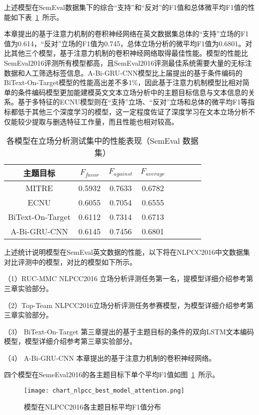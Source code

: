 上述模型在SemEval数据集下的综合“支持”和“反对”的F1值和总体微平均F1值的性能如下表~\ref{semeval_attention_res}~所示。


本章提出的基于注意力机制的卷积神经网络在英文数据集总体的“支持”立场的F1值为0.614，“反对”立场的F1值为0.745，总体立场分析的微平均F1值为0.6801。对比其他三个模型，基于注意力机制的卷积神经网络取得最佳性能。模型的性能比SemEval2016评测所有模型都高，且SemEval2016评测最佳系统需要大量的无标注数据和人工筛选标签信息。A-Bi-GRU-CNN模型比上届提出的基于条件编码的BiText-On-Target模型的性能高出差不多1\%，因此基于注意力机制模型比相对简单的条件编码模型更加能建模英文文本立场分析中的主题目标信息与文本信息的关系。基于多特征的ECNU模型则在“支持”立场、“反对”立场和总体的微平均F1等指标都低于其他三个深度学习的模型，这一定程度佐证了深度学习在文本立场分析不仅能较少提取与删选特征工作量，而且性能也相对较高。

\begin{table}[htbp]
	\caption[table123]{各模型在立场分析测试集中的性能表现（SemEval 数据集）}
	\vspace{0.5em}\centering\wuhao
	\label{semeval_attention_res}
	\begin{tabular}{cccccccc}
		\toprule[1.5pt]
		主题目标& $F_{favor}$&$F_{against}$&$F_{average}$ \\
		\midrule[1pt]
		MITRE&0.5932&0.7633&0.6782\\
		ECNU&0.6055&0.7054&0.6555\\
		BiText-On-Target&0.6112&0.7314&0.6713\\
			A-Bi-GRU-CNN&0.6145&0.7456&0.6801\\
		\bottomrule[1.5pt]
	\end{tabular}
\end{table}

上述统计说明模型在SemEval英文数据的性能，以下将在NLPCC2016中文数据集对比评测中的模型，对比的模型如下所示。

（1）RUC-MMC NLPCC2016 立场分析评测任务第一名，提模型详细介绍参考第三章实验部分。

（2）Top-Team NLPCC2016立场分析评测任务参赛模型，为模型详细介绍参考第三章实验部分。

（3） BiText-On-Target 第三章提出的基于主题目标的条件的双向LSTM文本编码模型，模型详细介绍参考第三章实验部分。

（4） A-Bi-GRU-CNN 本章提出的基于注意力机制的卷积神经网络。

四个模型在SemeEval2016的各主题目标下单个平均F1值如图~\ref{chart_nlpcc_best_model_attention}~所示。
\begin{figure}[htbp]
	\centering
	\texttt{[image: chart\_nlpcc\_best\_model\_attention.png]}
	\caption[rnn_vanish]{模型在NLPCC2016各主题目标平均F1值分布}
	\label{chart_nlpcc_best_model_attention}
\end{figure}


